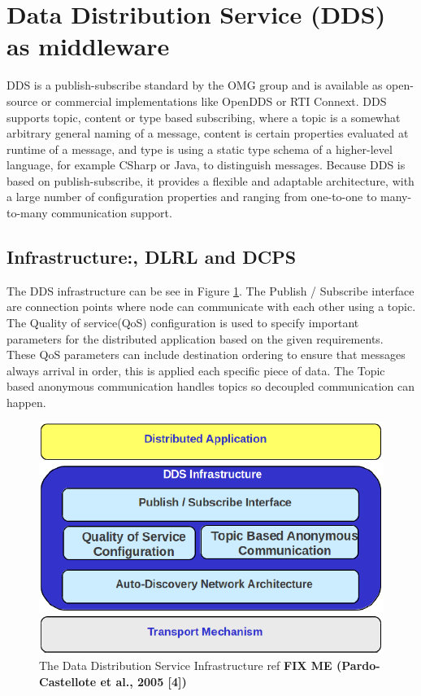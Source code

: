 \section{Data Distribution Service (DDS) as middleware}

DDS is a publish-subscribe standard by the OMG group and is available as open-source or commercial implementations like OpenDDS or RTI Connext. DDS supports topic, content or type based subscribing, where a topic is a somewhat arbitrary general naming of a message, content is certain properties evaluated at runtime of a message, and type is using a static type schema of a higher-level language, for example CSharp or Java, to distinguish messages. Because DDS is based on publish-subscribe, it provides a flexible and adaptable architecture, with a large number of configuration properties and ranging from one-to-one to many-to-many communication support.

\subsection{Infrastructure:, DLRL and DCPS}
The DDS infrastructure can be see in Figure \ref{fig:DDSIinfrastructure}. The Publish / Subscribe interface are connection points where node can communicate with each other using a topic. The Quality of service(QoS) configuration is used to specify important parameters for the distributed application based on the given requirements. These QoS parameters can include destination ordering to ensure that messages always arrival in order, this is applied each specific piece of data. The Topic based anonymous communication handles topics so  decoupled communication can happen.

\begin{figure}[h!]\label{}
	\centering
	\includegraphics[scale=0.8]{middleware/DDSIinfrastructure.png}
	\caption{The Data Distribution Service Infrastructure ref \textbf{ FIX ME (Pardo-Castellote et al., 2005 [4])}}
	\label{fig:DDSIinfrastructure}
\end{figure}

